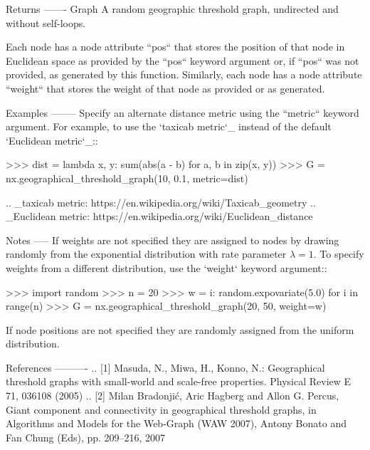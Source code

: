 \begin{DoxyVerb}
Returns
-------
Graph
    A random geographic threshold graph, undirected and without
    self-loops.

    Each node has a node attribute ``pos`` that stores the
    position of that node in Euclidean space as provided by the
    ``pos`` keyword argument or, if ``pos`` was not provided, as
    generated by this function. Similarly, each node has a node
    attribute ``weight`` that stores the weight of that node as
    provided or as generated.

Examples
--------
Specify an alternate distance metric using the ``metric`` keyword
argument. For example, to use the `taxicab metric`_ instead of the
default `Euclidean metric`_::

    >>> dist = lambda x, y: sum(abs(a - b) for a, b in zip(x, y))
    >>> G = nx.geographical_threshold_graph(10, 0.1, metric=dist)

.. _taxicab metric: https://en.wikipedia.org/wiki/Taxicab_geometry
.. _Euclidean metric: https://en.wikipedia.org/wiki/Euclidean_distance

Notes
-----
If weights are not specified they are assigned to nodes by drawing randomly
from the exponential distribution with rate parameter $\lambda=1$.
To specify weights from a different distribution, use the `weight` keyword
argument::

>>> import random
>>> n = 20
>>> w = {i: random.expovariate(5.0) for i in range(n)}
>>> G = nx.geographical_threshold_graph(20, 50, weight=w)

If node positions are not specified they are randomly assigned from the
uniform distribution.

References
----------
.. [1] Masuda, N., Miwa, H., Konno, N.:
   Geographical threshold graphs with small-world and scale-free
   properties.
   Physical Review E 71, 036108 (2005)
.. [2]  Milan Bradonjić, Aric Hagberg and Allon G. Percus,
   Giant component and connectivity in geographical threshold graphs,
   in Algorithms and Models for the Web-Graph (WAW 2007),
   Antony Bonato and Fan Chung (Eds), pp. 209--216, 2007
\end{DoxyVerb}
 \mbox{\label{namespacenetworkx_1_1generators_1_1geometric_a4ca2553d54d1f2aeb54c71aa8d98e05f}} 
